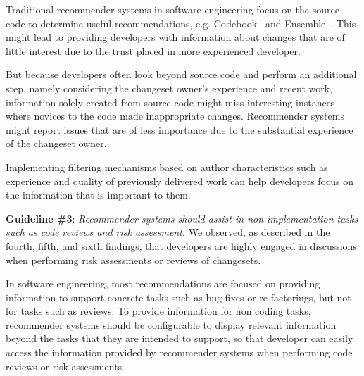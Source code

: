 \documentclass[12pt,oneside]{book}
\begin{document}
Traditional recommender systems in software engineering focus on the source code to determine useful recommendations, e.g. Codebook~\cite{begel:icse:2010} and Ensemble~\cite{xiang:rsse:2008}.
This might lead to providing developers with information about changes that are of little interest due to the trust placed in more experienced developer. 

But because developers often look beyond source code and perform an additional step, namely considering the changeset owner's experience and recent work, information solely created from source code might miss interesting instances where novices to the code made inappropriate changes.
Recommender systems might report issues that are of less importance due to the substantial experience of the changeset owner.

Implementing filtering mechanisms based on author characteristics such as experience and quality of previously delivered work can help developers focus on the information that is important to them.



\textbf{Guideline \#3}: \emph{Recommender systems should assist in non-implementation tasks such as code reviews and risk assessment.} 
We observed, as described in the fourth, fifth, and sixth findings, that developers are highly engaged in discussions when performing risk assessments or reviews of changesets. 

In software engineering, most recommendations are focused on providing information to support concrete tasks such as bug fixes or re-factorings, but not for tasks such as reviews. To provide information for non coding tasks, recommender systems should be configurable to display relevant information beyond the tasks that they are intended to support, so that developer can easily access the information provided by recommender systems when performing code reviews or risk assessments.

\end{document}
